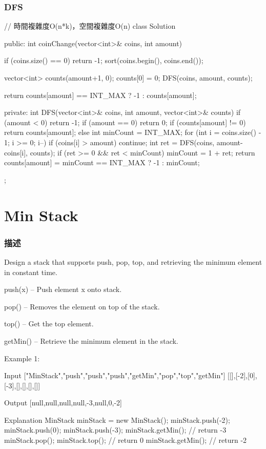 \subsubsection{DFS}
\begin{Code}
// 時間複雜度O(n*k)，空間複雜度O(n)
class Solution {
public:
    int coinChange(vector<int>& coins, int amount) {
        if (coins.size() == 0) return -1;
        sort(coins.begin(), coins.end());

        vector<int> counts(amount+1, 0);
        counts[0] = 0;
        DFS(coins, amount, counts);

        return counts[amount] == INT_MAX ? -1 : counts[amount];
    }
private:
    int DFS(vector<int>& coins, int amount, vector<int>& counts)
    {
        if (amount < 0) return -1;
        if (amount == 0) return 0;
        if (counts[amount] != 0) return counts[amount];
        else
        {
            int minCount = INT_MAX;
            for (int i = coins.size() - 1; i >= 0; i--)
            {
                if (coins[i] > amount) continue;
                int ret = DFS(coins, amount-coins[i], counts);
                if (ret >= 0 && ret < minCount)
                    minCount = 1 + ret;
            }
            return counts[amount] = minCount == INT_MAX ? -1 : minCount;
        }
    }
};
\end{Code}

\section{Min Stack} %
\label{sec:min-stack}

\subsubsection{描述}
Design a stack that supports push, pop, top, and retrieving the minimum element in constant time.

\begindot
\item push(x) -- Push element x onto stack.
\item pop() -- Removes the element on top of the stack.
\item top() -- Get the top element.
\item getMin() -- Retrieve the minimum element in the stack.
\myenddot

Example 1:
\begin{Code}
Input
["MinStack","push","push","push","getMin","pop","top","getMin"]
[[],[-2],[0],[-3],[],[],[],[]]

Output
[null,null,null,null,-3,null,0,-2]

Explanation
MinStack minStack = new MinStack();
minStack.push(-2);
minStack.push(0);
minStack.push(-3);
minStack.getMin(); // return -3
minStack.pop();
minStack.top();    // return 0
minStack.getMin(); // return -2
\end{Code}


